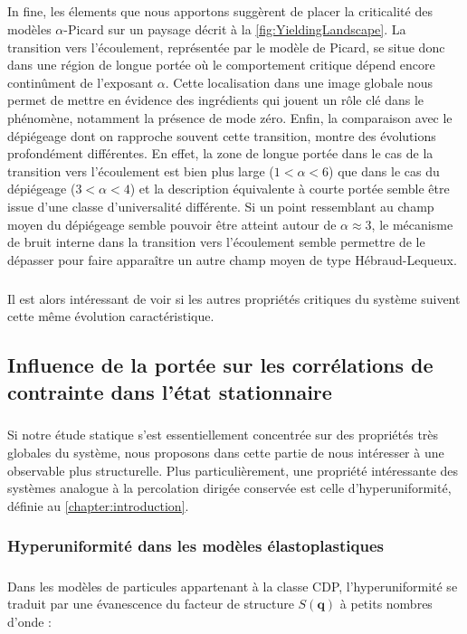 \subparagraph{}In fine, les élements que nous apportons suggèrent de placer la criticalité des modèles $\alpha$-Picard sur un paysage décrit à la \autoref{fig:YieldingLandscape}. La transition vers l'écoulement, représentée par le modèle de Picard, se situe donc dans une région de longue portée où le comportement critique dépend encore continûment de l'exposant $\alpha$. Cette localisation dans une image globale nous permet de mettre en évidence des ingrédients qui jouent un rôle clé dans le phénomène, notamment la présence de mode zéro. Enfin, la comparaison avec le dépiégeage dont on rapproche souvent cette transition, montre des évolutions profondément différentes. En effet, la zone de longue portée dans le cas de la transition vers l'écoulement est bien plus large ($1<\alpha<6$) que dans le cas du dépiégeage ($3<\alpha<4$) et la description équivalente à courte portée semble être issue d'une classe d'universalité différente. Si un point ressemblant au champ moyen du dépiégeage semble pouvoir être atteint autour de $\alpha\approx 3$, le mécanisme de bruit interne dans la transition vers l'écoulement semble permettre de le dépasser pour faire apparaître un autre champ moyen de type Hébraud-Lequeux.

\subparagraph{}Il est alors intéressant de voir si les autres propriétés critiques du système suivent cette même évolution caractéristique.

\subsection{Influence de la portée sur les corrélations de contrainte dans l'état stationnaire}

\subparagraph{}Si notre étude statique s'est essentiellement concentrée sur des propriétés très globales du système, nous proposons dans cette partie de nous intéresser à une observable plus structurelle. Plus particulièrement, une propriété intéressante des systèmes analogue à la percolation dirigée conservée est celle d'hyperuniformité, définie au \autoref{chapter:introduction}.

\subsubsection{Hyperuniformité dans les modèles élastoplastiques}

\subparagraph{}Dans les modèles de particules appartenant à la classe CDP, l'hyperuniformité se traduit par une évanescence du facteur de structure $S(\mathbf{q})$ à petits nombres d'onde :

